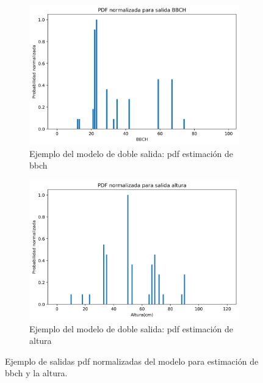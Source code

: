 \begin{figure}[H]
\centering
\begin{subfigure}{0.9\textwidth}
  \centering
  \includegraphics[width=0.95\linewidth]{archivos/tfg/Pixel/BBCHH_PDF_BBCH}
  \caption{Ejemplo del modelo de doble salida: \gls{pdf} estimación de \gls{bbch}\label{fig:p_sub1}}
\end{subfigure}
\begin{subfigure}{0.9\textwidth}
  \centering
  \includegraphics[width=0.95\linewidth]{archivos/tfg/Pixel/BBCHH_PDF_H}
  \caption{Ejemplo del modelo de doble salida: \gls{pdf} estimación de altura\label{fig:p_sub2}}
\end{subfigure}
\caption{Ejemplo de salidas \gls{pdf} normalizadas del modelo para estimación de \gls{bbch} y la altura. \label{fig:p_pdf_bh}}
\end{figure}

